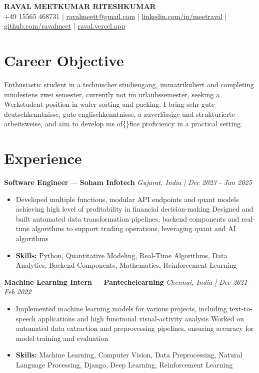 \documentclass[a4paper,10pt]{article}
\begin{document}
\begin{center}
  {\Large\bfseries RAVAL MEETKUMAR RITESHKUMAR}\\[2pt]
  {\small +49 15565 468731 \;|\; \href{mailto:ravalmeett@gmail.com}{ravalmeett@gmail.com} \;|\; \href{https://www.linkedin.com/in/meetraval/}{linkedin.com/in/meetraval} \;|\; \href{https://github.com/ravalmeet}{github.com/ravalmeet} \;|\; \href{https://raval.vercel.app/}{raval.vercel.app}}
\end{center}
\vspace{-3pt}

\section*{Career Objective}
Enthusiastic student in a technischer studiengang, immatrikuliert and completing mindestens zwei semester, currently not im urlaubssemester, seeking a Werkstudent position in wafer sorting and packing. I bring sehr gute deutschkenntnisse, gute englischkenntnisse, a zuverlässige und strukturierte arbeitsweise, and aim to develop ms of\{\}fice proficiency in a practical setting.\par

\section*{Experience}
\textbf{Software Engineer} — \textbf{Soham Infotech} \hfill \textit{Gujarat, India \;|\; Dec 2023 - Jan 2025}\par
\vspace{1pt}
\begin{itemize}
  \item Developed multiple functions, modular API endpoints and quant models achieving high level of profitability in financial decision-making Designed and built automated data transformation pipelines, backend components and real-time algorithms to support trading operations, leveraging quant and AI algorithms
  \item \textbf{Skills:} Python, Quantitative Modeling, Real-Time Algorithms, Data Analytics, Backend Components, Mathematics, Reinforcement Learning
\end{itemize}
\vspace{3pt}
\textbf{Machine Learning Intern} — \textbf{Pantechelearning} \hfill \textit{Chennai, India \;|\; Dec 2021 - Feb 2022}\par
\vspace{1pt}
\begin{itemize}
  \item Implemented machine learning models for various projects, including text-to-speech applications and high functional visual-activity analysis Worked on automated data extraction and preprocessing pipelines, ensuring accuracy for model training and evaluation
  \item \textbf{Skills:} Machine Learning, Computer Vision, Data Preprocessing, Natural Language Processing, Django, Deep Learning, Reinforcement Learning
\end{itemize}
\end{document}
